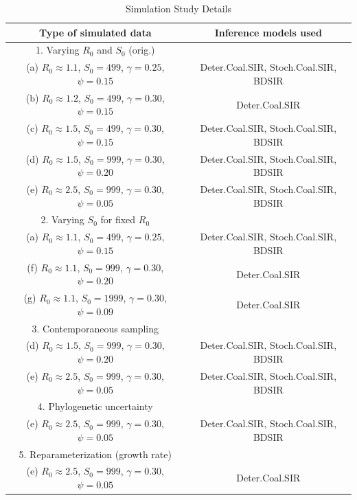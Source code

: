 \documentclass[10pt]{article}
\begin{document}
%
\begin{table}[!ht]
\begin{center}
\caption{\large{Simulation Study Details}}
\vspace{3mm}
\label{table:simSeq}
\begin{tabular}{|c|c|}
\hline
\bf{Type of simulated data} & \bf{Inference models used} \\ 
	\hline
	\hline
1. Varying $R_0$ and $S_0$ (orig.) &  \\
(a) $R_{0}\approx 1.1$, $S_{0}=499$, $\gamma=0.25$, $\psi=0.15$ & Deter.Coal.SIR, Stoch.Coal.SIR, BDSIR \\
(b) $R_{0}\approx 1.2$, $S_{0}=499$, $\gamma=0.30$, $\psi=0.15$ & Deter.Coal.SIR \\
(c) $R_{0}\approx 1.5$, $S_{0}=499$, $\gamma=0.30$, $\psi=0.15$ & Deter.Coal.SIR, Stoch.Coal.SIR, BDSIR \\
(d) $R_{0}\approx 1.5$, $S_{0}=999$, $\gamma=0.30$, $\psi=0.20$ & Deter.Coal.SIR, Stoch.Coal.SIR, BDSIR \\
(e) $R_{0}\approx 2.5$, $S_{0}=999$, $\gamma=0.30$, $\psi=0.05$ & Deter.Coal.SIR, Stoch.Coal.SIR, BDSIR \\
   \hline
   \hline
2. Varying $S_0$ for fixed $R_0$ &  \\
(a) $R_{0}\approx 1.1$, $S_{0}=499$, $\gamma=0.25$, $\psi=0.15$ & Deter.Coal.SIR, Stoch.Coal.SIR, BDSIR \\
(f) $R_{0}\approx 1.1$, $S_{0}=999$, $\gamma=0.30$, $\psi=0.20$ & Deter.Coal.SIR \\
(g) $R_{0}\approx 1.1$, $S_{0}=1999$, $\gamma=0.30$, $\psi=0.09$ & Deter.Coal.SIR \\
   \hline
   \hline
3. Contemporaneous sampling & \\
(d) $R_{0}\approx 1.5$, $S_{0}=999$, $\gamma=0.30$, $\psi=0.20$ & Deter.Coal.SIR, Stoch.Coal.SIR, BDSIR \\
(e) $R_{0}\approx 2.5$, $S_{0}=999$, $\gamma=0.30$, $\psi=0.05$ & Deter.Coal.SIR, Stoch.Coal.SIR, BDSIR \\
   \hline
   \hline
4. Phylogenetic uncertainty &  \\
(e) $R_{0}\approx 2.5$, $S_{0}=999$, $\gamma=0.30$, $\psi=0.05$ & Deter.Coal.SIR, Stoch.Coal.SIR, BDSIR \\	
   \hline
   \hline
5. Reparameterization (growth rate) &  \\
(e) $R_{0}\approx 2.5$, $S_{0}=999$, $\gamma=0.30$, $\psi=0.05$ & Deter.Coal.SIR \\
   \hline
\end{tabular}
\end{center}
\end{table}
\end{document}
